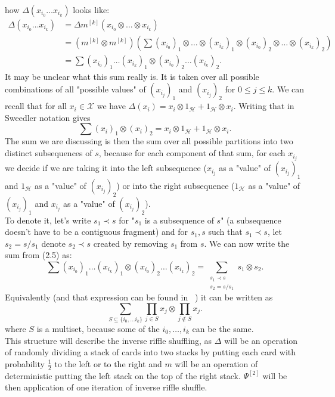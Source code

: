 \documentclass[a4paper, 12pt]{article}
\begin{document}
how $\Delta(x_{i_0}\dots x_{i_k})$ looks like:
\begin{align}
\Delta(x_{i_0}\dots x_{i_k}) &= \Delta m^{[k]}(x_{i_0} \otimes \dots \otimes x_{i_k}) \\
&= (m^{[k]} \otimes m^{[k]}) \left(\sum (x_{i_0})_1 \otimes \dots \otimes (x_{i_k})_1 \otimes
(x_{i_0})_2 \otimes \dots \otimes (x_{i_k})_2\right) \\
&= \sum (x_{i_0})_1 \dots (x_{i_k})_1 \otimes
(x_{i_0})_2 \dots (x_{i_k})_2.
\end{align}
It may be unclear what this sum really is. It is taken over all possible combinations of all "possible
values" of $(x_{i_j})_1$ and $(x_{i_j})_2$ for $ 0 \leq j \leq k$. We can recall that for all
$x_i \in \mathcal{X}$ we
have $\Delta(x_i) = x_i \otimes 1_\mathcal{H} + 1_\mathcal{H} \otimes x_i$. Writing that in Sweedler
notation gives
\begin{equation*}
\sum(x_i)_1 \otimes (x_i)_2 = x_i \otimes 1_\mathcal{H} + 1_\mathcal{H} \otimes x_i.
\end{equation*}
The sum we are discussing is then the sum over all possible partitions into two distinct subsequences of $s$,
because for each component of that sum, for each $x_{i_j}$ we decide if we are taking it into the left
subsequence ($x_{i_j}$ as a "value" of $(x_{i_j})_1$ and $1_\mathcal{H}$ as a "value" of $(x_{i_j})_2$) or
into the right subsequence ($1_\mathcal{H}$ as a "value" of $(x_{i_j})_1$ and $x_{i_j}$ as a "value" of
$(x_{i_j})_2$).
\\ To denote it, let's write $s_1 \prec s$ for "$s_1$ is a subsequence of $s$" (a subsequence doesn't have
to be a contiguous fragment) and for $s_1, s$
such that $s_1 \prec s$, let $s_2 = s / s_1$ denote $s_2 \prec s$ created by removing
$s_1$ from $s$. We can now write the sum from (2.5) as:
\begin{equation*}
\sum (x_{i_0})_1 \dots (x_{i_k})_1 \otimes (x_{i_0})_2 \dots (x_{i_k})_2 =
\sum_{\substack{s_1 \prec s \\ s_2 = s / s_1}} s_1 \otimes s_2.
\end{equation*}
Equivalently (and that expression can be found in ~\cite{Diaconis2014}) it can be written as
\begin{equation*}
\sum_{S \subseteq \{ i_0, \dots i_k \} } \prod_{j \in S} x_j \otimes \prod_{j \notin S} x_j.
\end{equation*}
where $S$ is a multiset, because some of the $i_0, \dots, i_k$ can be the same. \\
\indent This structure will describe the inverse riffle shuffling, as $\Delta$ will be an operation of
randomly dividing a stack of cards into two stacks by putting each card with probability $\frac{1}{2}$ to
the left or to the right and $m$ will be an operation of deterministic putting the left stack on the top
of the right stack. $\Psi^{[2]}$ will be then application of one iteration of inverse riffle shuffle.
\end{document}
